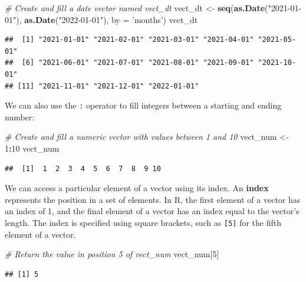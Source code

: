 \documentclass[]{book}
\newenvironment{Shaded}{\begin{snugshade}}{\end{snugshade}}
\newcommand{\CommentTok}[1]{\textcolor[rgb]{0.56,0.35,0.01}{\textit{#1}}}
\newcommand{\DataTypeTok}[1]{\textcolor[rgb]{0.13,0.29,0.53}{#1}}
\newcommand{\DecValTok}[1]{\textcolor[rgb]{0.00,0.00,0.81}{#1}}
\newcommand{\KeywordTok}[1]{\textcolor[rgb]{0.13,0.29,0.53}{\textbf{#1}}}
\newcommand{\NormalTok}[1]{#1}
\newcommand{\OperatorTok}[1]{\textcolor[rgb]{0.81,0.36,0.00}{\textbf{#1}}}
\newcommand{\StringTok}[1]{\textcolor[rgb]{0.31,0.60,0.02}{#1}}
\begin{document}
\begin{Shaded}
\begin{Highlighting}[]
\CommentTok{# Create and fill a date vector named vect_dt}
\NormalTok{vect_dt <-}\StringTok{ }\KeywordTok{seq}\NormalTok{(}\KeywordTok{as.Date}\NormalTok{(}\StringTok{"2021-01-01"}\NormalTok{), }\KeywordTok{as.Date}\NormalTok{(}\StringTok{"2022-01-01"}\NormalTok{), }\DataTypeTok{by =} \StringTok{'months'}\NormalTok{)}
\NormalTok{vect_dt}
\end{Highlighting}
\end{Shaded}

\begin{verbatim}
##  [1] "2021-01-01" "2021-02-01" "2021-03-01" "2021-04-01" "2021-05-01"
##  [6] "2021-06-01" "2021-07-01" "2021-08-01" "2021-09-01" "2021-10-01"
## [11] "2021-11-01" "2021-12-01" "2022-01-01"
\end{verbatim}

We can also use the \texttt{:} operator to fill integers between a starting and ending number:

\begin{Shaded}
\begin{Highlighting}[]
\CommentTok{# Create and fill a numeric vector with values between 1 and 10}
\NormalTok{vect_num <-}\StringTok{ }\DecValTok{1}\OperatorTok{:}\DecValTok{10}
\NormalTok{vect_num}
\end{Highlighting}
\end{Shaded}

\begin{verbatim}
##  [1]  1  2  3  4  5  6  7  8  9 10
\end{verbatim}

We can access a particular element of a vector using its index. An \textbf{index} represents the position in a set of elements. In R, the first element of a vector has an index of 1, and the final element of a vector has an index equal to the vector's length. The index is specified using square brackets, such as \texttt{{[}5{]}} for the fifth element of a vector.

\begin{Shaded}
\begin{Highlighting}[]
\CommentTok{# Return the value in position 5 of vect_num}
\NormalTok{vect_num[}\DecValTok{5}\NormalTok{]}
\end{Highlighting}
\end{Shaded}

\begin{verbatim}
## [1] 5
\end{verbatim}
\end{document}
